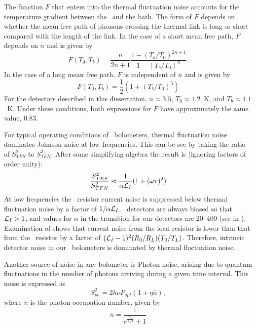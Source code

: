 The function $F$ that enters into the thermal fluctuation noise accounts for the temperature gradient between the \TES\ and the bath.
The form of $F$ depends on whether the mean free path of phonons crossing the thermal link is long or short compared with the length of the link.
In the case of a short mean free path, $F$ depends on $n$ and is given by \cite{mather_bolometer_1982}
\begin{equation}
  F(T_0,T_b) = \frac{n}{2n+1} \frac{1 - (T_b/T_0)^{2n+1}}{1 - (T_b/T_0)^{n}}.
\end{equation}
In the case of a long mean free path, $F$ is independent of $n$ and is given by \cite{boyle_performance_1959}
\begin{equation}
  F(T_0, T_b) = \frac{1}{2} (1 + (T_b/T_0)^5)
\end{equation}
For the detectors described in this dissertation, $n \approx 3.5$, $T_0 \approx 1.2$~K, and $T_b \approx 1.1$~K.
Under these conditions, both expressions for $F$ have approximately the same value, 0.83.

For typical operating conditions of \TES\ bolometers, thermal fluctuation noise dominates Johnson noise at low frequencies.
This can be see by taking the ratio of $S^2_{TES}$ to $S^2_{TFN}$.
After some simplifying algebra the result is (ignoring factors of order unity):
\begin{equation}
\frac{S^2_{TES}}{S^2_{TFN}} \approx \frac{1}{\alpha \mathcal{L}_I} (1 + (\omega \tau)^2)
\end{equation}
At low frequencies the \TES\ resistor current noise is suppressed below thermal fluctuation noise by a factor of $1/\alpha \mathcal{L}_I$.
\TES\ detectors are always biased so that $\mathcal{L}_I > 1$, and values for $\alpha$ in the transition for our detectors are 20--400 (see  in ).
Examination of  shows that current noise from the load resistor is lower than that from the \TES\ resistor by a factor of $(\mathcal{L}_I-1)^2 (R_0 / R_L) (T_0/T_L)$.
Therefore, intrinsic detector noise in our \TES\ bolometers is dominated by thermal fluctuation noise.

Another source of noise in any bolometer is Photon noise, arising due to quantum fluctuations in the number of photons arriving during a given time interval.
This noise is expressed as \cite{zmuidzinas_thermal_2003}
\begin{equation}\label{eqn:photon-noise}
  S^2_{ph} = 2 h \nu P_{opt} (1 + \eta \bar{n}),
\end{equation}
where $\bar{n}$ is the photon occupation number, given by
\begin{equation}
  \bar{n} = \frac{1}{e^{\frac{h \nu}{k_B T}} + 1}
\end{equation}

